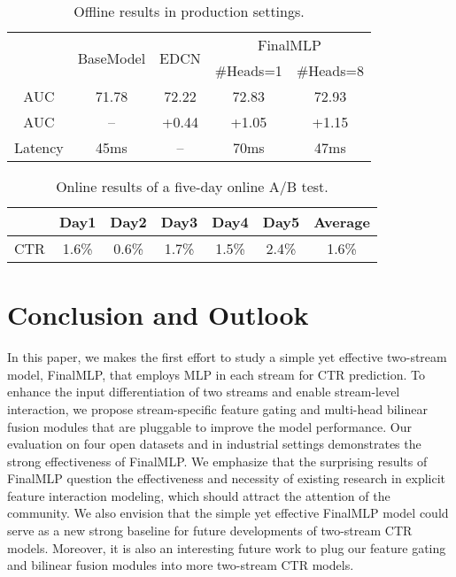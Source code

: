 \documentclass[letterpaper]{article} \usepackage{aaai23}  \usepackage{times}  \usepackage{helvet}  \usepackage{courier}  \usepackage[hyphens]{url}  \usepackage{graphicx} \urlstyle{rm} \def\UrlFont{\rm}  \usepackage{natbib}  \usepackage{caption} \frenchspacing  \setlength{\pdfpagewidth}{8.5in}  \setlength{\pdfpageheight}{11in}  \usepackage{algorithm}
\begin{document}
\begin{table}[!t]
    \small
    \renewcommand\arraystretch{1.15}
    \centering
    \caption{Offline results in production settings.}
    \begin{tabular}{c|c|c|c|c}
    \toprule
\multirow{2}{*}{} & \multirow{2}{*}{BaseModel} & \multirow{2}{*}{EDCN} & \multicolumn{2}{c}{FinalMLP} \\
                  &                            &                       & \multicolumn{1}{c}{\#Heads=1}      & \#Heads=8      \\ \midrule
        AUC & 71.78 & 72.22 & 72.83 & 72.93 \\ 
        AUC & -- & +0.44 & +1.05 & +1.15 \\\hline
        Latency & 45ms & -- & 70ms & 47ms \\\bottomrule
    \end{tabular}\label{tab:offline} 
\end{table}

\begin{table}[!t]
    \small
    \centering
    \caption{Online results of a five-day online A/B test.}
    \begin{tabular}{ccccccc}
    \toprule
         & Day1 & Day2 & Day3 & Day4 & Day5 & Average \\ \midrule
        CTR & 1.6\% & 0.6\% & 1.7\% & 1.5\% & 2.4\% & 1.6\% \\ \bottomrule
    \end{tabular}
    \label{tab:online_test} 
    \vspace{-1ex}
\end{table}



 \section{Conclusion and Outlook}
In this paper, we makes the first effort to study a simple yet effective two-stream model, FinalMLP, that employs MLP in each stream for CTR prediction. To enhance the input differentiation of two streams and enable stream-level interaction, we propose stream-specific feature gating and multi-head bilinear fusion modules that are pluggable to improve the model performance. Our evaluation on four open datasets and in industrial settings demonstrates the strong effectiveness of FinalMLP. We emphasize that the surprising results of FinalMLP question the effectiveness and necessity of existing research in explicit feature interaction modeling, which should attract the attention of the community. We also envision that the simple yet effective FinalMLP model could serve as a new strong baseline for future developments of two-stream CTR models. Moreover, it is also an interesting future work to plug our feature gating and bilinear fusion modules into more two-stream CTR models. 
\end{document}
